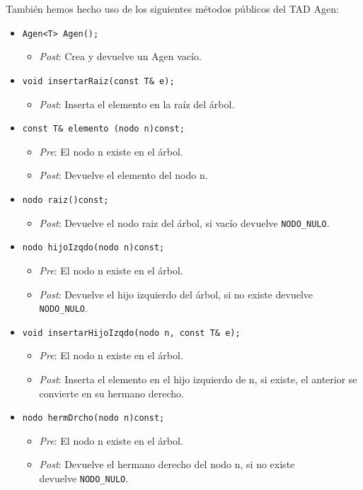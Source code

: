 También hemos hecho uso de los siguientes métodos públicos del TAD Agen:
\begin{itemize}
  \item \verb |Agen<T> Agen();|
  \begin{itemize}
    \item \textit{Post}: Crea y devuelve un Agen vacío.
  \end{itemize}
  \item \verb |void insertarRaiz(const T& e);|
  \begin{itemize}
    \item \textit{Post}: Inserta el elemento en la raíz del árbol.
  \end{itemize}
  \item \verb |const T& elemento (nodo n)const;|
  \begin{itemize}
    \item \textit{Pre}: El nodo n existe en el árbol.
    \item \textit{Post}: Devuelve el elemento del nodo n.
  \end{itemize}
  \item \verb |nodo raiz()const;|
  \begin{itemize}
    \item \textit{Post}: Devuelve el nodo raiz del árbol, si vacío devuelve \texttt{NODO\_NULO}.
  \end{itemize}
  \item \verb |nodo hijoIzqdo(nodo n)const;|
  \begin{itemize}
    \item \textit{Pre}: El nodo n existe en el árbol.
    \item \textit{Post}: Devuelve el hijo izquierdo del árbol, si no existe devuelve \texttt{NODO\_NULO}.
  \end{itemize}
  \item \verb |void insertarHijoIzqdo(nodo n, const T& e);|
  \begin{itemize}
    \item \textit{Pre}: El nodo n existe en el árbol.
    \item \textit{Post}: Inserta el elemento en el hijo izquierdo de n, si existe, el anterior se convierte en su hermano derecho.
  \end{itemize}
  \item \verb |nodo hermDrcho(nodo n)const;|
  \begin{itemize}
    \item \textit{Pre}: El nodo n existe en el árbol.
    \item \textit{Post}: Devuelve el hermano derecho del nodo n, si no existe\\ devuelve \texttt{NODO\_NULO}.
  \end{itemize}
\end{itemize}